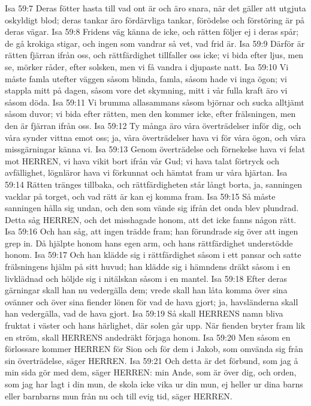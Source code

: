 Isa 59:7  Deras fötter hasta till vad ont är och äro snara, när det gäller att utgjuta oskyldigt blod; deras tankar äro fördärvliga tankar, förödelse och förstöring är på deras vägar.
Isa 59:8  Fridens väg känna de icke, och rätten följer ej i deras spår; de gå krokiga stigar, och ingen som vandrar så vet, vad frid är.
Isa 59:9  Därför är rätten fjärran ifrån oss, och rättfärdighet tillfaller oss icke; vi bida efter ljus, men se, mörker råder, efter solsken, men vi få vandra i djupaste natt.
Isa 59:10  Vi måste famla utefter väggen såsom blinda, famla, såsom hade vi inga ögon; vi stappla mitt på dagen, såsom vore det skymning, mitt i vår fulla kraft äro vi såsom döda.
Isa 59:11  Vi brumma allasammans såsom björnar och sucka alltjämt såsom duvor; vi bida efter rätten, men den kommer icke, efter frälsningen, men den är fjärran ifrån oss.
Isa 59:12  Ty många äro våra överträdelser inför dig, och våra synder vittna emot oss; ja, våra överträdelser hava vi för våra ögon, och våra missgärningar känna vi.
Isa 59:13  Genom överträdelse och förnekelse hava vi felat mot HERREN, vi hava vikit bort ifrån vår Gud; vi hava talat förtryck och avfällighet, lögnläror hava vi förkunnat och hämtat fram ur våra hjärtan.
Isa 59:14  Rätten tränges tillbaka, och rättfärdigheten står långt borta, ja, sanningen vacklar på torget, och vad rätt är kan ej komma fram.
Isa 59:15  Så måste sanningen hålla sig undan, och den som vände sig ifrån det onda blev plundrad. Detta såg HERREN, och det misshagade honom, att det icke fanns någon rätt.
Isa 59:16  Och han såg, att ingen trädde fram; han förundrade sig över att ingen grep in. Då hjälpte honom hans egen arm, och hans rättfärdighet understödde honom.
Isa 59:17  Och han klädde sig i rättfärdighet såsom i ett pansar och satte frälsningens hjälm på sitt huvud; han klädde sig i hämndens dräkt såsom i en livklädnad och höljde sig i nitälskan såsom i en mantel.
Isa 59:18  Efter deras gärningar skall han nu vedergälla dem; vrede skall han låta komma över sina ovänner och över sina fiender lönen för vad de hava gjort; ja, havsländerna skall han vedergälla, vad de hava gjort.
Isa 59:19  Så skall HERRENS namn bliva fruktat i väster och hans härlighet, där solen går upp. När fienden bryter fram lik en ström, skall HERRENS andedräkt förjaga honom.
Isa 59:20  Men såsom en förlossare kommer HERREN för Sion och för dem i Jakob, som omvända sig från sin överträdelse, säger HERREN.
Isa 59:21  Och detta är det förbund, som jag å min sida gör med dem, säger HERREN: min Ande, som är över dig, och orden, som jag har lagt i din mun, de skola icke vika ur din mun, ej heller ur dina barns eller barnbarns mun från nu och till evig tid, säger HERREN.
